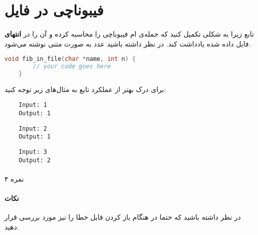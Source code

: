 \documentclass[../main.tex]{subfiles}
\begin{document}
\section{فیبوناچی در فایل}
\paragraph{}
تابع زیرا به شکلی تکمیل کنید 
که جمله‌ی ام فیبوناچی را محاسبه کرده
و آن را در \textbf{انتهای} فایل داده شده یادداشت کند.
در نظر داشته باشید عدد به صورت متنی نوشته می‌شود.

\begin{latin}
\begin{lstlisting}[language=c]
    void fib_in_file(char *name, int n) {
        // your code goes here
    }
\end{lstlisting}
\end{latin}

برای درک بهتر از عملکرد تابع به مثال‌های زیر توجه کنید:

\begin{latin}
\begin{verbatim}
    Input: 1
    Output: 1
\end{verbatim}

\begin{verbatim}
    Input: 2
    Output: 1
\end{verbatim}

\begin{verbatim}
    Input: 3
    Output: 2
\end{verbatim}
\end{latin}

\paragraph{}
۴ نمره

\paragraph{نکات}
در نظر داشته باشید که حتما در هنگام باز کردن فایل خطا را نیز مورد بررسی قرار دهید.
\end{document}
